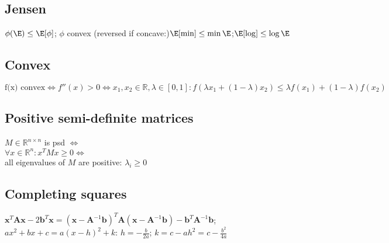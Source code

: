 \subsection*{Jensen}
$\phi(\E)\leq \E[\phi]$; $\phi$ convex (reversed if concave:)$\E[\min]\leq \min\E$;$\E[\log]\leq\log\E$
\subsection*{Convex}
$\text{f(x) convex} \Leftrightarrow f''(x) > 0 \Leftrightarrow x_1,x_2 \in \mathbb{R}, \lambda \in [0,1]: 
f(\lambda x_1 + (1-\lambda) x_2) \leq \lambda f(x_1) + (1-\lambda) f(x_2)$

\subsection*{Positive semi-definite matrices}
$M \in \mathbb{R}^{n\times n}$ is psd $\Leftrightarrow$\\
$\forall x \in \mathbb{R}^n: x^TMx \geq 0 \Leftrightarrow$\\
all eigenvalues of $M$ are positive: $\lambda_i\geq 0$
\subsection*{Completing squares}
$\mathbf{x}^T\mathbf{A}\mathbf{x}-2\mathbf{b}^T\mathbf{x} = (\mathbf{x}-\mathbf{A}^{-1}\mathbf{b})^T\mathbf{A}(\mathbf{x}-\mathbf{A}^{-1}\mathbf{b})-\mathbf{b}^T\mathbf{A}^{-1}\mathbf{b}$;\\
$ax^{2}+bx+c=a(x-h)^{2}+k$: $h=-{\frac {b}{2a}}$; $k=c-ah^{2}=c-{\frac {b^{2}}{4a}}$







